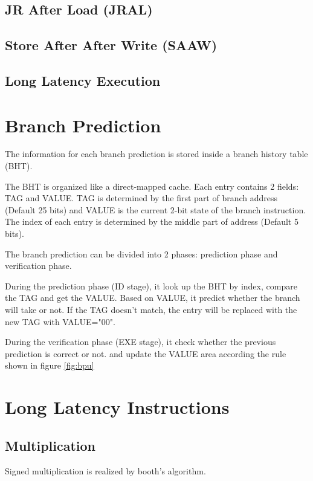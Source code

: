 \subsection[JR After Load (JRAL)]{JR After Load (JRAL)}
\subsection[Store After After Write (SAAW)]{Store After After Write (SAAW)}
\subsection[Long Latency Execution]{Long Latency Execution}

\section[Branch Prediction]{Branch Prediction}
\label{ch:bpu}
The information for each branch prediction is stored inside a branch history table (BHT).

The BHT is organized like a direct-mapped cache. Each entry contains 2 fields:
TAG and VALUE. TAG is determined by the first part of branch address (Default 25 bits) and VALUE
is the current 2-bit state of the branch instruction. The index of each entry is
determined by the middle part of address (Default 5 bits).

The branch prediction can be divided into 2 phases: prediction phase and verification phase.

During the prediction phase (ID stage), it look up the BHT by index, compare the TAG and get the VALUE.
Based on VALUE, it predict whether the branch will take or not. If the TAG doesn't match,
the entry will be replaced with the new TAG with VALUE="00".

During the verification phase (EXE stage), it check whether the previous prediction
is correct or not. and update the VALUE area according the rule shown in figure \ref{fig:bpu}

\section[Long Latency Instructions]{Long Latency Instructions}
\label{ch:lli}
\subsection[Multiplication]{Multiplication}
Signed multiplication is realized by booth's algorithm.

